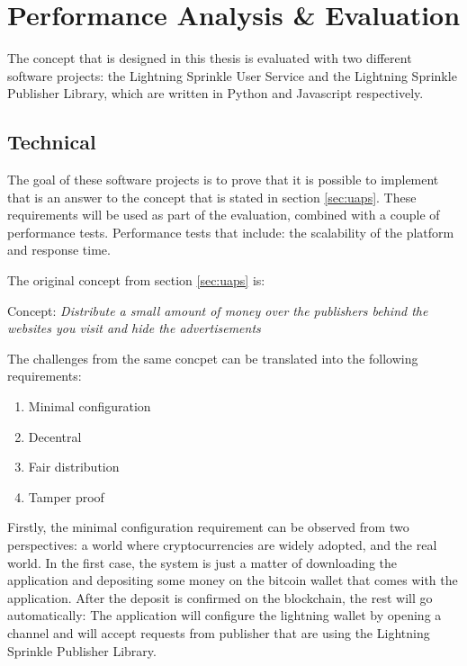 \chapter{Performance Analysis \& Evaluation}
\label{cha:evaluation}

The concept that is designed in this thesis is evaluated with two different software projects: the Lightning Sprinkle User Service and the Lightning Sprinkle Publisher Library, which are written in Python and Javascript respectively. 

\section{Technical}

The goal of these software projects is to prove that it is possible to implement that is an answer to the concept that is stated in section \ref{sec:uaps}. These requirements will be used as part of the evaluation, combined with a couple of performance tests. Performance tests that include: the scalability of the platform and response time. 

\noindent The original concept from section \ref{sec:uaps} is:

\vspace{1em}

Concept: \textit{Distribute a small amount of money over the publishers behind the websites you visit and hide the advertisements}

\vspace{1em}

\noindent The challenges from the same concpet can be translated into the following requirements:
\begin{enumerate}
  \item Minimal configuration
  \item Decentral
  \item Fair distribution
  \item Tamper proof
\end{enumerate}

Firstly, the minimal configuration requirement can be observed from two perspectives: a world where cryptocurrencies are widely adopted, and the real world. In the first case, the system is just a matter of downloading the application and depositing some money on the bitcoin wallet that comes with the application. After the deposit is confirmed on the blockchain, the rest will go automatically: The application will configure the lightning wallet by opening a channel and will accept requests from publisher that are using the Lightning Sprinkle Publisher Library. 

